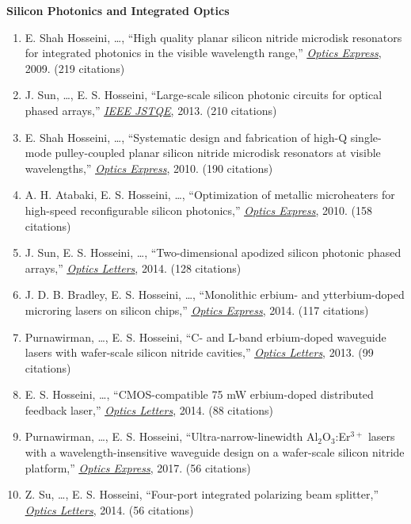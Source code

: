 \noindent\textbf{Silicon Photonics and Integrated Optics}
\begin{enumerate}
    \item E. Shah Hosseini, \ldots, ``High quality planar silicon nitride microdisk resonators for integrated photonics in the visible wavelength range,'' \href{https://doi.org/10.1364/OE.17.014596}{\underline{\textit{Optics Express}}}, 2009. (219 citations)
    \item J. Sun, \ldots, E. S. Hosseini, ``Large-scale silicon photonic circuits for optical phased arrays,'' \href{https://doi.org/10.1109/JSTQE.2013.2283793}{\underline{\textit{IEEE JSTQE}}}, 2013. (210 citations)
    \item E. Shah Hosseini, \ldots, ``Systematic design and fabrication of high-Q single-mode pulley-coupled planar silicon nitride microdisk resonators at visible wavelengths,'' \href{https://doi.org/10.1364/OE.18.012725}{\underline{\textit{Optics Express}}}, 2010. (190 citations)
    \item A. H. Atabaki, E. S. Hosseini, \ldots, ``Optimization of metallic microheaters for high-speed reconfigurable silicon photonics,'' \href{https://doi.org/10.1364/OE.18.018312}{\underline{\textit{Optics Express}}}, 2010. (158 citations)
    \item J. Sun, E. S. Hosseini, \ldots, ``Two-dimensional apodized silicon photonic phased arrays,'' \href{https://doi.org/10.1364/OL.39.003476}{\underline{\textit{Optics Letters}}}, 2014. (128 citations)
    \item J. D. B. Bradley, E. S. Hosseini, \ldots, ``Monolithic erbium- and ytterbium-doped microring lasers on silicon chips,''\newline
    \href{https://doi.org/10.1364/OE.22.012226}{\underline{\textit{Optics Express}}}, 2014. (117 citations)
    \item Purnawirman, \ldots, E. S. Hosseini, ``C- and L-band erbium-doped waveguide lasers with wafer-scale silicon nitride cavities,'' \href{https://doi.org/10.1364/OL.38.001760}{\underline{\textit{Optics Letters}}}, 2013. (99 citations)
    \item E. S. Hosseini, \ldots, ``CMOS-compatible 75 mW erbium-doped distributed feedback laser,'' \href{https://doi.org/10.1364/OL.39.003106}{\underline{\textit{Optics Letters}}}, 2014. (88 citations)
    \item Purnawirman, \ldots, E. S. Hosseini, ``Ultra-narrow-linewidth Al$_2$O$_3$:Er$^{3+}$ lasers with a wavelength-insensitive waveguide design on a wafer-scale silicon nitride platform,''
    \href{https://doi.org/10.1364/OE.25.013705}{\underline{\textit{Optics Express}}}, 2017. (56 citations)
    \item Z. Su, \ldots, E. S. Hosseini, ``Four-port integrated polarizing beam splitter,'' \href{https://doi.org/10.1364/OL.39.005451}{\underline{\textit{Optics Letters}}}, 2014. (56 citations)
\end{enumerate}

